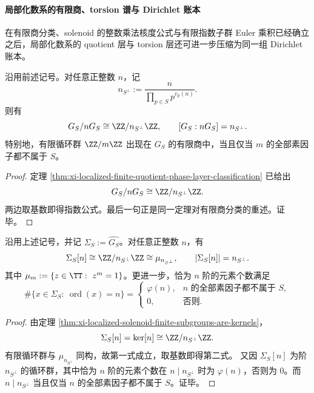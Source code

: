 \paragraph{局部化数系的有限商、torsion 谱与 Dirichlet 账本}
在有限商分类、solenoid 的整数乘法核度公式与有限指数子群 Euler 乘积已经确立之后，局部化数系的 quotient 层与 torsion 层还可进一步压缩为同一组 Dirichlet 账本。

\begin{theorem}[局部化数系有限商的指数账本与循环实现判据]\label{thm:xi-localized-quotient-index-ledger}
沿用前述记号。对任意正整数 \(n\)，记
\[
n_{S^\perp}:=\frac{n}{\prod_{p\in S}p^{v_p(n)}}.
\]
则有
\[
G_S/nG_S\cong \ZZ/n_{S^\perp}\ZZ,
\qquad
[G_S:nG_S]=n_{S^\perp}.
\]
特别地，有限循环群 \(\ZZ/m\ZZ\) 出现在 \(G_S\) 的有限商中，当且仅当 \(m\) 的全部素因子都不属于 \(S\)。
\end{theorem}
\begin{proof}
定理 \ref{thm:xi-localized-finite-quotient-phase-layer-classification} 已给出
\[
G_S/nG_S\cong \ZZ/n_{S^\perp}\ZZ.
\]
两边取基数即得指数公式。最后一句正是同一定理对有限商分类的重述。证毕。
\end{proof}

\begin{theorem}\label{thm:xi-localized-torsion-exact-order-ledger}
沿用上述记号，并记 \(\Sigma_S:=\widehat{G_S}\)。对任意正整数 \(n\)，有
\[
\Sigma_S[n]\cong \ZZ/n_{S^\perp}\ZZ\cong \mu_{n_{S^\perp}},
\qquad
|\Sigma_S[n]|=n_{S^\perp}.
\]
其中 \(\mu_m:=\{z\in\TT:\ z^m=1\}\)。更进一步，恰为 \(n\) 阶的元素个数满足
\[
\#\{x\in\Sigma_S:\ \operatorname{ord}(x)=n\}
=
\begin{cases}
\varphi(n),& \text{\(n\) 的全部素因子都不属于 }S,\\[1mm]
0,& \text{否则}.
\end{cases}
\]
\end{theorem}
\begin{proof}
由定理 \ref{thm:xi-localized-solenoid-finite-subgroups-are-kernels}，
\[
\Sigma_S[n]=\ker[n]\cong \ZZ/n_{S^\perp}\ZZ.
\]
有限循环群与 \(\mu_{n_{S^\perp}}\) 同构，故第一式成立，取基数即得第二式。
又因 \(\Sigma_S[n]\) 为阶 \(n_{S^\perp}\) 的循环群，其中恰为 \(n\) 阶的元素个数在 \(n\mid n_{S^\perp}\) 时为 \(\varphi(n)\)，否则为 \(0\)。而 \(n\mid n_{S^\perp}\) 当且仅当 \(n\) 的全部素因子都不属于 \(S\)。证毕。
\end{proof}

